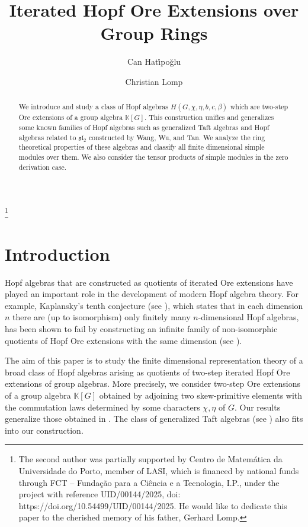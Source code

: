 \documentclass[11pt, twoside]{amsart}
\title{Iterated Hopf Ore Extensions over Group Rings}
\author{Can Hat\.{i}po\u{g}lu}
\author{Christian Lomp}
\theoremstyle{definition}
\newcommand{\KK}{\mathbb{K}}
\begin{document}
\begin{abstract}
    We introduce and study a class of Hopf algebras $H(G, \chi, \eta, b, c, \beta)$ which are two-step Ore extensions of a group algebra $\KK[G]$. This construction unifies and generalizes some known families of Hopf algebras such as generalized Taft algebras and Hopf algebras related to $\mathfrak{sl}_2$ constructed by Wang, Wu, and Tan. We analyze the ring theoretical properties of these algebras and classify all finite dimensional simple modules over them. We also consider the tensor products of simple modules in the zero derivation case. 
\end{abstract}

\thanks{The second author was partially supported by Centro de Matemática da Universidade do Porto, member of LASI, which is financed by
national funds through FCT – Fundação para a Ciência e a Tecnologia, I.P., under the project with reference UID/00144/2025, doi: https://doi.org/10.54499/UID/00144/2025. He would like to dedicate this paper to the cherished memory of his father, Gerhard Lomp.}
\maketitle


\section{Introduction}
Hopf algebras that are constructed as quotients of iterated Ore extensions have played an important role in the development of modern Hopf algebra theory. For example, Kaplansky's tenth conjecture (see \cite{Kaplansky}), which states that in each dimension $n$ there are (up to isomorphism) only finitely many $n$-dimensional Hopf algebras, has been shown to fail by constructing an infinite family of non-isomorphic quotients of Hopf Ore extensions with the same dimension (see \cites{Beattie, Gelaki, Muller}). 

The aim of this paper is to study the finite dimensional representation theory of a broad class of Hopf algebras arising as quotients of two-step iterated Hopf Ore extensions of group algebras. More precisely, we consider two-step Ore extensions of a group algebra $\KK[G]$ obtained by adjoining two skew-primitive elements with the commutation laws determined by some characters $\chi, \eta$ of $G$. Our results generalize those obtained in \cite{Wang-Wu-Tan}. The class of generalized Taft algebras (see \cite{Halbig}) also fits into our construction.
\end{document}
